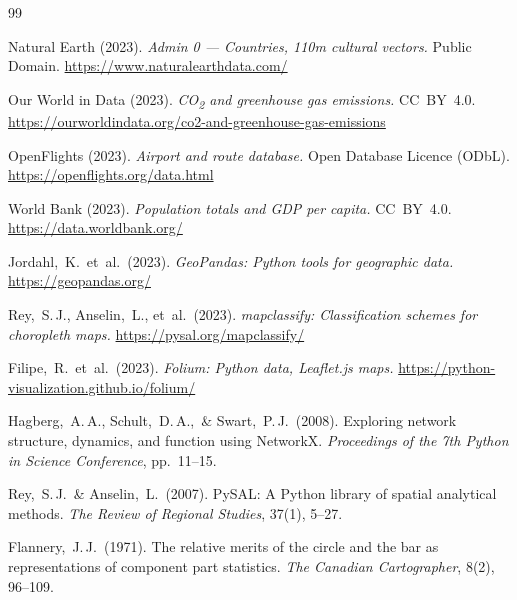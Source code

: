 \documentclass[12pt, a4paper, oneside]{report}
\begin{document}
\clearpage
{}
\begin{thebibliography}{99}

Natural Earth (2023).
\textit{Admin 0 --- Countries, 110m cultural vectors.}
Public Domain.
\url{https://www.naturalearthdata.com/}

Our World in Data (2023).
\textit{CO\textsubscript{2} and greenhouse gas emissions.}
CC~BY~4.0.
\url{https://ourworldindata.org/co2-and-greenhouse-gas-emissions}

OpenFlights (2023).
\textit{Airport and route database.}
Open Database Licence (ODbL).
\url{https://openflights.org/data.html}

World Bank (2023).
\textit{Population totals and GDP per capita.}
CC~BY~4.0.
\url{https://data.worldbank.org/}

Jordahl,~K.\ et~al.\ (2023).
\textit{GeoPandas: Python tools for geographic data.}
\url{https://geopandas.org/}

Rey,~S.\,J., Anselin,~L., et~al.\ (2023).
\textit{mapclassify: Classification schemes for choropleth maps.}
\url{https://pysal.org/mapclassify/}

Filipe,~R.\ et~al.\ (2023).
\textit{Folium: Python data, Leaflet.js maps.}
\url{https://python-visualization.github.io/folium/}

Hagberg,~A.\,A., Schult,~D.\,A.,\ \& Swart,~P.\,J.\ (2008).
Exploring network structure, dynamics, and function using NetworkX\@.
\textit{Proceedings of the 7th Python in Science Conference}, pp.~11--15.

Rey,~S.\,J.\ \& Anselin,~L.\ (2007).
PySAL: A Python library of spatial analytical methods.
\textit{The Review of Regional Studies}, 37(1), 5--27.

Flannery,~J.\,J.\ (1971).
The relative merits of the circle and the bar as representations of component part
statistics.
\textit{The Canadian Cartographer}, 8(2), 96--109.

\end{thebibliography}

\appendix
\end{document}
